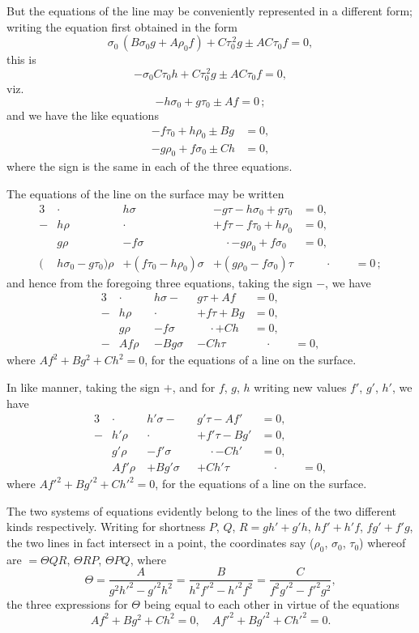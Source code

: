 \documentclass[11pt,a4paper]{article}
\theoremstyle{plain}
\theoremstyle{definition}
\begin{document}
But the equations of the line may be conveniently represented in a different form; writing the equation first obtained in the form
\[ \sigma_0\,(B\sigma_0 g + A\rho_0 f) + C\tau_0^{\,2} g \pm AC\tau_0 f = 0, \]
this is
\[ -\sigma_0 C\tau_0 h + C\tau_0^{\,2} g \pm AC\tau_0 f = 0, \]
viz.
\[ -h\sigma_0 + g\tau_0 \pm Af = 0\,; \]
and we have the like equations
\begin{align*}
-f\tau_0 + h\rho_0 \pm Bg &= 0, \\
-g\rho_0 + f\sigma_0 \pm Ch &= 0,
\end{align*}
where the sign is the same in each of the three equations.

The equations of the line on the surface may be written
\begin{alignat*}{3}
&\cdot\qquad & h\sigma &- g\tau - h\sigma_0 + g\tau_0 &= 0, \\
-&h\rho &\cdot\qquad & + f\tau - f\tau_0 + h\rho_0 &= 0, \\
&g\rho & - f\sigma &\quad\cdot - g\rho_0 + f\sigma_0 &= 0, \\
(&h\sigma_0-g\tau_0)\rho &+ (f\tau_0-h\rho_0)\sigma &+ (g\rho_0-f\sigma_0)\tau &\qquad\cdot\qquad = 0\,;
\end{alignat*}
and hence from the foregoing three equations, taking the sign $-$, we have
\begin{alignat*}{3}
&\cdot\qquad & h\sigma -\phantom{g}\, &g\tau + Af &= 0, \\
-&h\rho &\cdot\qquad & + f\tau + Bg &= 0, \\
&g\rho & - f\sigma &\quad\cdot + Ch &= 0, \\
-&Af\rho & - Bg\sigma & - Ch\tau &\quad\cdot\qquad = 0,
\end{alignat*}
where $Af^2 + Bg^2 + Ch^2 = 0$, for the equations of a line on the surface.

In like manner, taking the sign $+$, and for $f$, $g$, $h$ writing new values $f'$, $g'$, $h'$, we have
\begin{alignat*}{3}
&\cdot\qquad & h'\sigma -\phantom{g'}\, &g'\tau - Af' &= 0, \\
-&h'\rho &\cdot\qquad & + f'\tau - Bg' &= 0, \\
&g'\rho & - f'\sigma &\quad\cdot - Ch' &= 0, \\
&Af'\rho & + Bg'\sigma & + Ch'\tau &\quad\cdot\qquad = 0,
\end{alignat*}
where $Af'^2 + Bg'^2 + Ch'^2 = 0$, for the equations of a line on the surface.

The two systems of equations evidently belong to the lines of the two different kinds respectively. Writing for shortness $P$, $Q$, $R = gh' + g'h$, $hf' + h'f$, $fg' + f'g$, the two lines in fact intersect in a point, the coordinates say ($\rho_0$, $\sigma_0$, $\tau_0$) whereof are $= \Theta QR$, $\Theta RP$, $\Theta PQ$, where
\[ \Theta = \frac{A}{g^2h'^2 - g'^2h^2} = \frac{B}{h^2f'^2 - h'^2f^2} = \frac{C}{f^2g'^2 - f'^2g^2}, \]
the three expressions for $\Theta$ being equal to each other in virtue of the equations
\[ Af^2 + Bg^2 + Ch^2 = 0,\quad Af'^2 + Bg'^2 + Ch'^2 = 0. \]
\end{document}
